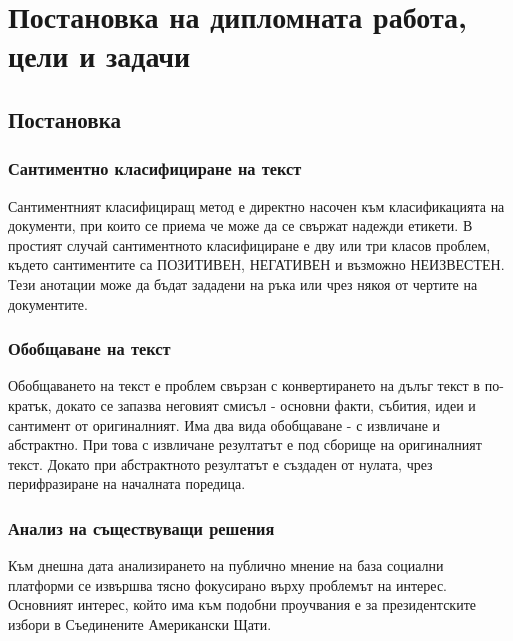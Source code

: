\documentclass{article}
\newcounter{subsubsubsection}[subsubsection]
\begin{document}
    \newpage


    \section{Постановка на дипломната работа, цели и задачи}

    \subsection{Постановка}

    \subsubsection{Сантиментно класифициране на текст}

    Сантиментният класифициращ метод е директно насочен към класификацията на документи, при които се приема че може да се
    свържат надежди етикети. В простият случай сантиментното класифициране е дву или три класов проблем, където сантиментите
    са ПОЗИТИВЕН, НЕГАТИВЕН и възможно НЕИЗВЕСТЕН. Тези анотации може да бъдат зададени на ръка или чрез някоя от чертите на
    документите. \cite{intro-to-nlp-mit}

    \subsubsection{Обобщаване на текст}

    Обобщаването на текст е проблем свързан с конвертирането на дълъг текст в по-кратък, докато се запазва неговият смисъл
    - основни факти, събития, идеи и сантимент от оригиналният. Има два вида обобщаване - с извличане и абстрактно. При
    това с извличане резултатът е под сборище на оригиналният текст. Докато при абстрактното резултатът е създаден от
    нулата, чрез перифразиране на началната поредица. \cite{intro-to-nlp-mit}

    \subsubsection{Анализ на съществуващи решения}


    Към днешна дата анализирането на публично мнение на база социални платформи се извършва тясно фокусирано върху проблемът
    на интерес. Основният интерес, който има към подобни проучвания е за президентските избори в Съединените Американски
    Щати.
\end{document}
